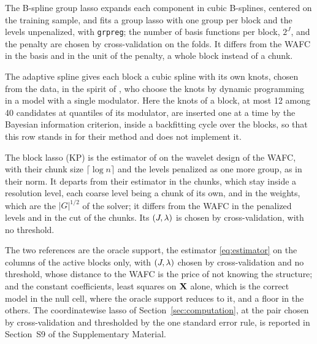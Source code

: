 The B-spline group lasso expands each component in cubic B-splines, centered
on the training sample, and fits a group lasso \citep{Yuan-Lin-2006} with one
group per block and the levels unpenalized, with \texttt{grpreg}; the number
of basis functions per block, $2^J$, and the penalty are chosen by
cross-validation on the folds. It differs from the WAFC in the basis and in
the unit of the penalty, a whole block instead of a chunk.

The adaptive spline gives each block a cubic spline with its own knots, chosen
from the data, in the spirit of \citet{Wang-Jiang-Liu-2024}, who choose the
knots by dynamic programming in a model with a single modulator. Here the
knots of a block, at most 12 among 40 candidates at quantiles of its
modulator, are inserted one at a time by the Bayesian information criterion,
inside a backfitting cycle over the blocks, so that this row stands in for
their method and does not implement it.

The block lasso (KP) is the estimator of \citet{Klopp-Pensky-2015} on the
wavelet design of the WAFC, with their chunk size $\lceil\log n\rceil$ and the
levels penalized as one more group, as in their norm. It departs from their
estimator in the chunks, which stay inside a resolution level, each coarse
level being a chunk of its own, and in the weights, which are the $|G|^{1/2}$
of the solver; it differs from the WAFC in the penalized levels and in the
cut of the chunks. Its $(J,\lambda)$ is chosen by cross-validation, with no
threshold.

The two references are the oracle support, the estimator
\eqref{eq:estimator} on the columns of the active blocks only, with $(J,\lambda)$
chosen by cross-validation and no threshold, whose distance to the WAFC is the
price of not knowing the structure; and the constant coefficients, least
squares on $\mathbf{X}$ alone, which is the correct model in the null cell, where the
oracle support reduces to it, and a floor in the others. The coordinatewise
lasso of Section~\ref{sec:computation}, at the pair chosen by
cross-validation and thresholded by the one standard error rule, is reported
in Section~S9 of the Supplementary Material.

